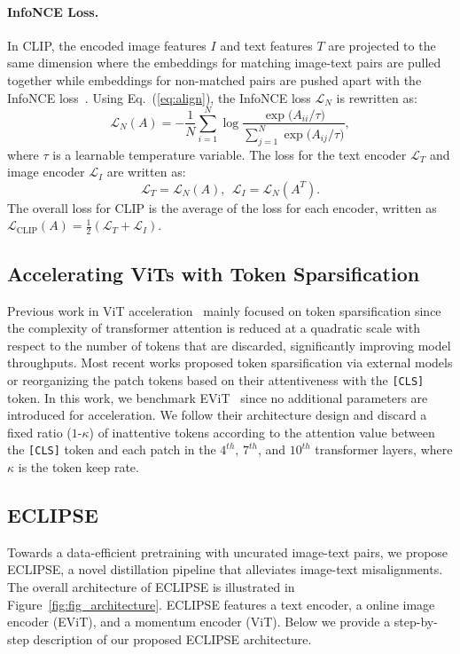 \paragraph{InfoNCE Loss.}
In CLIP, the encoded image features $I$ and text features $T$ are projected to the same dimension where the embeddings for matching image-text pairs are pulled together while embeddings for non-matched pairs are pushed apart with the InfoNCE loss~\cite{oord2018representation}.
Using Eq.~(\ref{eq:align}), the InfoNCE loss $\mathcal{L}_N$ is rewritten as:
\begin{equation}
\label{eq:infoNCE}
    \mathcal{L}_{N}(A)=-\frac{1}{N}\sum_{i=1}^N\log{\frac{\exp{\big(A_{ii}/\tau\big)}}{\sum_{j=1}^N\exp{\big(A_{ij}/\tau\big)}}},
\end{equation}
where $\tau$ is a learnable temperature variable.
The loss for the text encoder $\mathcal{L}_{T}$ and image encoder $\mathcal{L}_{I}$ are written as:
\begin{equation}
\label{eq:CLIP}
    \mathcal{L}_{T}= \mathcal{L}_{N}(A), ~~\mathcal{L}_{I}= \mathcal{L}_{N}(A^T).
\end{equation}
The overall loss for CLIP is the average of the loss for each encoder, written as $\mathcal{L}_{\text{CLIP}}(A)=\frac{1}{2}(\mathcal{L}_T+\mathcal{L}_I)$.

\subsection{Accelerating ViTs with Token Sparsification}
Previous work in ViT acceleration~\cite{rao2021dynamicvit,liang2022evit} mainly focused on token sparsification since the complexity of transformer attention is reduced at a quadratic scale with respect to the number of tokens that are discarded, significantly improving model throughputs.
Most recent works proposed token sparsification via external models or reorganizing the patch tokens based on their attentiveness with the \texttt{[CLS]} token.
In this work, we benchmark EViT~\cite{liang2022evit} since no additional parameters are introduced for acceleration.
We follow their architecture design and discard a fixed ratio ($1$-$\kappa$) of inattentive tokens according to the attention value between the \texttt{[CLS]} token and each patch in the $4^{th}$, $7^{th}$, and $10^{th}$ transformer layers, where $\kappa$ is the token keep rate.

\subsection{ECLIPSE}
Towards a data-efficient pretraining with uncurated image-text pairs, we propose ECLIPSE, a novel distillation pipeline that alleviates image-text misalignments.
The overall architecture of ECLIPSE is illustrated in Figure~\ref{fig:fig_architecture}.
ECLIPSE features a text encoder, a online image encoder (EViT), and a momentum encoder (ViT).
Below we provide a step-by-step description of our proposed ECLIPSE architecture.

